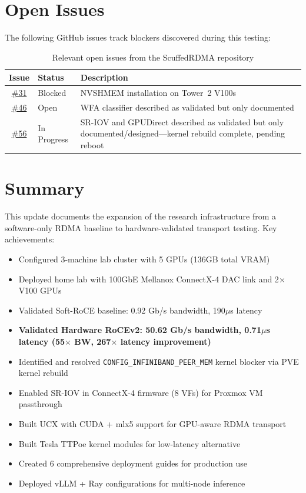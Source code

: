 \documentclass[10pt,letterpaper]{article}
\begin{document}
\section{Open Issues}

The following GitHub issues track blockers discovered during this testing:

\begin{table}[H]
\centering
\small
\begin{tabular}{@{}clp{7cm}@{}}
\toprule
\textbf{Issue} & \textbf{Status} & \textbf{Description} \\
\midrule
\href{https://github.com/ndg8743/ScuffedRDMA/issues/31}{\#31} & Blocked & NVSHMEM installation on Tower~2 V100s \\
\href{https://github.com/ndg8743/ScuffedRDMA/issues/46}{\#46} & Open & WFA classifier described as validated but only documented \\
\href{https://github.com/ndg8743/ScuffedRDMA/issues/56}{\#56} & In Progress & SR-IOV and GPUDirect described as validated but only documented/designed---kernel rebuild complete, pending reboot \\
\bottomrule
\end{tabular}
\caption{Relevant open issues from the ScuffedRDMA repository}
\end{table}

\section{Summary}

This update documents the expansion of the research infrastructure from a software-only RDMA baseline to hardware-validated transport testing. Key achievements:

\begin{itemize}[noitemsep]
    \item Configured 3-machine lab cluster with 5 GPUs (136GB total VRAM)
    \item Deployed home lab with 100GbE Mellanox ConnectX-4 DAC link and 2$\times$ V100 GPUs
    \item Validated Soft-RoCE baseline: 0.92 Gb/s bandwidth, 190$\mu$s latency
    \item \textbf{Validated Hardware RoCEv2: 50.62 Gb/s bandwidth, 0.71$\mu$s latency (55$\times$ BW, 267$\times$ latency improvement)}
    \item Identified and resolved \texttt{CONFIG\_INFINIBAND\_PEER\_MEM} kernel blocker via PVE kernel rebuild
    \item Enabled SR-IOV in ConnectX-4 firmware (8 VFs) for Proxmox VM passthrough
    \item Built UCX with CUDA + mlx5 support for GPU-aware RDMA transport
    \item Built Tesla TTPoe kernel modules for low-latency alternative
    \item Created 6 comprehensive deployment guides for production use
    \item Deployed vLLM + Ray configurations for multi-node inference
\end{itemize}
\end{document}
